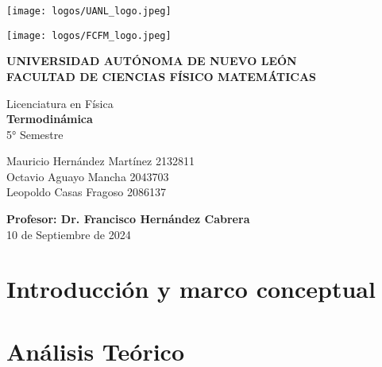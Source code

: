 \documentclass[12pt]{article}
\newcommand{\doctitle}{Termodinámica}
\newcommand{\docsubtitle}{5° Semestre}
\newcommand{\authorinfo}{Mauricio Hernández Martínez 2132811 \\
    Octavio Aguayo Mancha 2043703
 \\
    Leopoldo Casas Fragoso 2086137
}
\begin{document}
\begin{titlepage}
    \centering
    \begin{minipage}{0.4\textwidth}
        \raggedright
        \texttt{[image: logos/UANL\_logo.jpeg]} %
    \end{minipage}
    \begin{minipage}{0.4\textwidth}
        \raggedleft
        \texttt{[image: logos/FCFM\_logo.jpeg]} %
    \end{minipage}
    
    \vspace{0.5cm}
    
    {\Large \textbf{UNIVERSIDAD AUTÓNOMA DE NUEVO LEÓN}}\\[1.5cm]
    {\Large \textbf{FACULTAD DE CIENCIAS FÍSICO MATEMÁTICAS}}\\[1cm]
    
    \vspace{1cm}
    
    {\Large Licenciatura en Física}\\[0.5cm]
    
    {\Huge \textbf{\doctitle}}\\[0.5cm]
    {\Large \docsubtitle}\\[2cm]
    
    \begin{tabbing}
    \authorinfo
    \end{tabbing}
    
    \vfill
    
    \textbf{Profesor: Dr. Francisco Hernández Cabrera}\\[1.5cm]
    
    {\large 10 de Septiembre de 2024}
    
\end{titlepage}

\newpage
\tableofcontents
\newpage


\section{Introducción y marco conceptual}

\section{Análisis Teórico}
\end{document}

